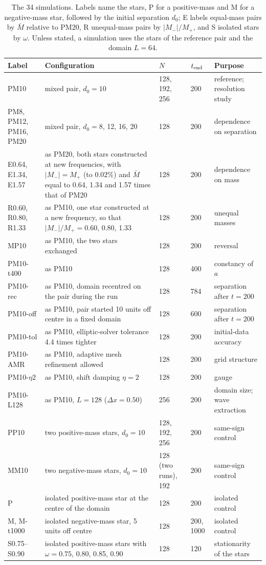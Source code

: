 \documentclass[twocolumn,floatfix,aps,prd,superscriptaddress,nofootinbib]{revtex4-2}
\begin{document}
\begin{table}[t]
\caption{The 34 simulations. Labels name the stars, P for a positive-mass and M for a negative-mass star, followed by the initial separation $d_0$; E labels equal-mass pairs by $\bar M$ relative to PM20, R unequal-mass pairs by $|M_-|/M_+$, and S isolated stars by $\omega$. Unless stated, a simulation uses the stars of the reference pair and the domain $L=64$.}
\label{tab:matrix}
\begin{ruledtabular}
\begin{tabular}{lp{}lll}
Label & Configuration & $N$ & $t_{\rm end}$ & Purpose \\
\hline
PM10 & mixed pair, $d_0=10$ & 128, 192, 256 & 200 & reference; resolution study \\
PM8, PM12, PM16, PM20 & mixed pair, $d_0=8$, 12, 16, 20 & 128 & 200 & dependence on separation \\
E0.64, E1.34, E1.57 & as PM20, both stars constructed at new frequencies, with $|M_-|=M_+$ (to $0.02\%$) and $\bar M$ equal to 0.64, 1.34 and 1.57 times that of PM20 & 128 & 200 & dependence on mass \\
R0.60, R0.80, R1.33 & as PM10, one star constructed at a new frequency, so that $|M_-|/M_+=0.60$, 0.80, 1.33 & 128 & 200 & unequal masses \\
MP10 & as PM10, the two stars exchanged & 128 & 200 & reversal \\
PM10-t400 & as PM10 & 128 & 400 & constancy of $a$ \\
PM10-rec & as PM10, domain recentred on the pair during the run & 128 & 784 & separation after $t=200$ \\
PM10-off & as PM10, pair started 10 units off centre in a fixed domain & 128 & 600 & separation after $t=200$ \\
PM10-tol & as PM10, elliptic-solver tolerance 4.4 times tighter & 128 & 200 & initial-data accuracy \\
PM10-AMR & as PM10, adaptive mesh refinement allowed & 128 & 200 & grid structure \\
PM10-$\eta$2 & as PM10, shift damping $\eta=2$ & 128 & 200 & gauge \\
PM10-L128 & as PM10, $L=128$ ($\Delta x=0.50$) & 256 & 200 & domain size; wave extraction \\
\hline
PP10 & two positive-mass stars, $d_0=10$ & 128, 192, 256 & 200 & same-sign control \\
MM10 & two negative-mass stars, $d_0=10$ & 128 (two runs), 192 & 200 & same-sign control \\
P & isolated positive-mass star at the centre of the domain & 128 & 200 & isolated control \\
M, M-t1000 & isolated negative-mass star, 5 units off centre & 128 & 200, 1000 & isolated control \\
S0.75--S0.90 & isolated positive-mass stars with $\omega=0.75$, 0.80, 0.85, 0.90 & 128 & 120 & stationarity of the stars \\
\end{tabular}
\end{ruledtabular}
\end{table}
\end{document}
